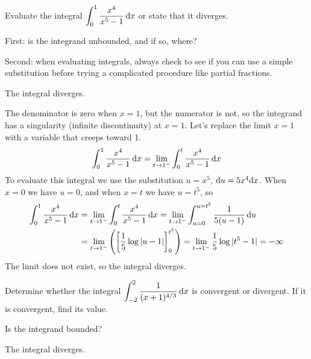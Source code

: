 \begin{Mquestion}[M105 2015A]
Evaluate the integral
$\displaystyle\int_0^1\frac{x^4}{x^5-1}\,\mathrm{d}x$ or state that
it diverges.
\end{Mquestion}

\begin{hint}
First: is the integrand unbounded, and if so, where?

Second: when evaluating integrals, always check to see if you can use a simple
substitution before trying a complicated procedure like partial fractions.
\end{hint}

\begin{answer}
The integral diverges.
\end{answer}

\begin{solution}
The denominator is zero when $x=1$, but the numerator is not, so the integrand has a
singularity (infinite discontinuity) at $x=1$. Let's replace the limit $x=1$ with a variable that creeps toward 1.
\begin{equation*}
\int_0^1\frac{x^4}{x^5-1}\,\mathrm{d}x
=\lim_{t\rightarrow 1^-}\int_0^t\frac{x^4}{x^5-1}\,\mathrm{d}x
\end{equation*}
To evaluate this integral we use the substitution
$u=x^5$, $\mathrm{d}u=5x^4\mathrm{d}x$. When $x=0$ we have $u=0$, and when $x=t$
we have $u=t^5$, so
\begin{align*}
\int_0^1\frac{x^4}{x^5-1}\,\mathrm{d}x&=\lim_{t \to 1^-}\int_{0}^{t}\frac{x^4}{x^5-1}\,\mathrm{d}x
=\lim_{t \to 1^-}\int_{u=0}^{u=t^5}\frac{1}{5(u-1)}\,\mathrm{d}u\\
&=\lim_{t \to 1^-}\left( \left[\frac{1}{5}\log|u-1|\right]_0^{t^5}\right)
=\lim_{t \to 1^-}\frac{1}{5}\log|t^5-1|=-\infty
\end{align*}
The limit does not exist, so the integral diverges.
\end{solution}




\begin{question}[2016Q4]
Determine whether the integral
$\displaystyle\int_{-2}^2\frac{1}{(x+1)^{4/3}}\,\mathrm{d}x$ is convergent
or divergent. If it is convergent, find its value.
\end{question}

\begin{hint}
Is the integrand bounded?
\end{hint}

\begin{answer}
The integral diverges.
\end{answer}

